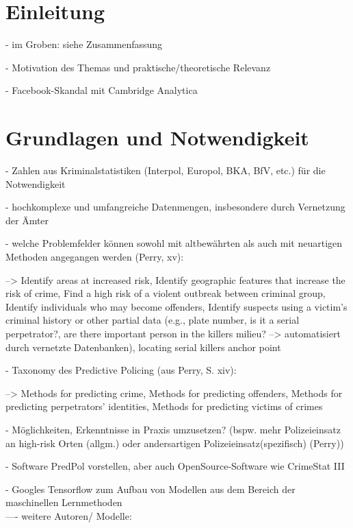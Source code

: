 \documentclass[a4paper,12pt,parskip,bibtotoc,liststotoc]{article}
\begin{document}
\newpage
\section{Einleitung}

- im Groben: siehe Zusammenfassung 

- Motivation des Themas und praktische/theoretische Relevanz

- Facebook-Skandal mit Cambridge Analytica 



\newpage
\section{Grundlagen und Notwendigkeit}

- Zahlen aus Kriminalstatistiken (Interpol, Europol, BKA, BfV, etc.) für die Notwendigkeit

- hochkomplexe und umfangreiche Datenmengen, insbesondere durch Vernetzung der Ämter

- welche Problemfelder können sowohl mit altbewährten als auch mit neuartigen Methoden angegangen werden (Perry, xv):

--> Identify areas at increased risk, Identify geographic features that increase the risk of crime, Find a high risk of a violent outbreak between criminal group, Identify individuals who may become offenders,
Identify suspects using a victim’s criminal history or other partial data (e.g., plate number, is it a serial perpetrator?, are there important person in the killers milieu? --> automatisiert durch vernetzte Datenbanken), locating serial killers anchor point


- Taxonomy des Predictive Policing (aus Perry, S. xiv):

--> Methods for predicting crime, Methods for predicting offenders, Methods for predicting perpetrators’ identities, Methods for predicting victims of crimes

- Möglichkeiten, Erkenntnisse in Praxis umzusetzen? (bspw. mehr Polizeieinsatz an high-risk Orten (allgm.) oder andersartigen Polizeieinsatz(spezifisch) (Perry))

- Software PredPol vorstellen, aber auch OpenSource-Software wie CrimeStat III

- Googles Tensorflow zum Aufbau von Modellen aus dem Bereich der maschinellen Lernmethoden\\




---- weitere Autoren/ Modelle: 
\end{document}
